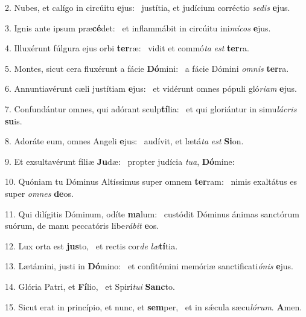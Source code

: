 2. Nubes, et calígo in circúitu \textbf{e}jus: \ast\  justítia, et judícium corréctio \textit{se}\textit{dis} \textbf{e}jus.\

3. Ignis ante ipsum præ\textbf{cé}det: \ast\  et inflammábit in circúitu ini\textit{mí}\textit{cos} \textbf{e}jus.\

4. Illuxérunt fúlgura ejus orbi \textbf{ter}ræ: \ast\  vidit et commó\textit{ta} \textit{est} \textbf{ter}ra.\

5. Montes, sicut cera fluxérunt a fácie \textbf{Dó}mini: \ast\  a fácie Dómini \textit{om}\textit{nis} \textbf{ter}ra.\

6. Annuntiavérunt cæli justítiam \textbf{e}jus: \ast\  et vidérunt omnes pópuli gló\textit{ri}\textit{am} \textbf{e}jus.\

7. Confundántur omnes, qui adórant sculp\textbf{tí}lia: \ast\  et qui gloriántur in simu\textit{lá}\textit{cris} \textbf{su}is.\

8. Adoráte eum, omnes Angeli \textbf{e}jus: \ast\  audívit, et lætá\textit{ta} \textit{est} \textbf{Si}on.\

9. Et exsultavérunt fíliæ \textbf{Ju}dæ: \ast\  propter judícia \textit{tu}\textit{a}, \textbf{Dó}mine:\

10. Quóniam tu Dóminus Altíssimus super omnem \textbf{ter}ram: \ast\  nimis exaltátus es super \textit{om}\textit{nes} \textbf{de}os.\

11. Qui dilígitis Dóminum, odíte \textbf{ma}lum: \ast\  custódit Dóminus ánimas sanctórum suórum, de manu peccatóris libe\textit{rá}\textit{bit} \textbf{e}os.\

12. Lux orta est \textbf{jus}to, \ast\  et rectis cor\textit{de} \textit{læ}\textbf{tí}tia.\

13. Lætámini, justi in \textbf{Dó}mino: \ast\  et confitémini memóriæ sanctificati\textit{ó}\textit{nis} \textbf{e}jus.\

14. Glória Patri, et \textbf{Fí}lio, \ast\  et Spirí\textit{tu}\textit{i} \textbf{Sanc}to.\

15. Sicut erat in princípio, et nunc, et \textbf{sem}per, \ast\  et in sǽcula sæcu\textit{ló}\textit{rum}. \textbf{A}men.\

